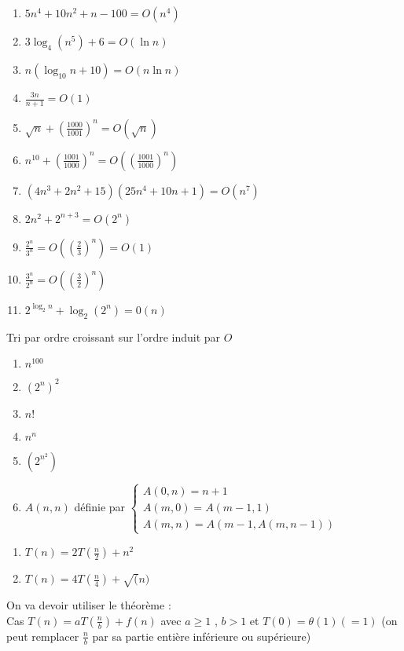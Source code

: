 \begin{enumerate}
	\item $5n^4+10n^2+n-100 = O(n^4)$
	\item $3\log_4(n^5)+6 = O(\ln n)$
	\item $n(\log_{10}n +10) = O(n\ln n)$
	\item $\frac{3n}{n+1} = O(1)$
	\item $\sqrt{n} + \left( \frac{1000}{1001} \right)^n = O(\sqrt{n})$
	\item $n^10 + \left( \frac{1001}{1000} \right)^n = O(\left( \frac{1001}{1000} \right)^n)$
	\item $(4n^3+2n^2+15)(25n^4+10n+1) = O(n^7)$
	\item $2n^2 +2^{n+3} = O(2^n)$
	\item $\frac{2^n}{3^n} = O(\left(\frac{2}{3}\right)^n) = O(1)$
	\item $\frac{3^n}{2^n} = O(\left(\frac{3}{2}\right)^n)$
	\item $2^{\log_2n} + \log_2(2^n) = 0(n)$ 
\end{enumerate}

 Tri par ordre croissant sur l'ordre induit par $O$
\begin{enumerate}
	\item $n^100$
	\item $(2^n)^2$
	\item $n!$
	\item $n^n$
	\item $(2^{n^2})$
	\item $A(n,n)$ définie par $\left\{ \begin{array}{l} A(0,n) = n+1 \\ A(m,0) = A(m-1,1) \\ A(m,n) = A(m-1,A(m,n-1)) \end{array}\right.$
\end{enumerate}

\begin{enumerate}
	\item $T(n) = 2T(\frac{n}{2}) + n^2$
	\item $T(n) = 4T(\frac{n}{4}) + \sqrt(n)$
\end{enumerate}
On va devoir utiliser le théorème :\\
 Cas $T(n) = aT(\frac{n}{b}) + f(n)$ avec $a \geq 1$ , $b > 1$ et $T(0) = \theta(1) (=1)$ (on peut remplacer $\frac{n}{b}$ par sa partie entière inférieure ou supérieure) \\

